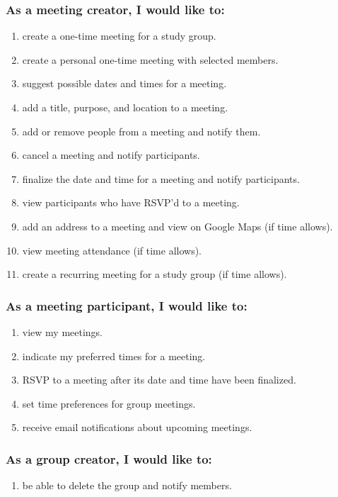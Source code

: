 \documentclass[12pt]{article}
\begin{document}
\subsubsection*{As a meeting creator, I would like to:}

\begin{enumerate}[nolistsep]
    \item create a one-time meeting for a study group.
    \item create a personal one-time meeting with selected members.
    \item suggest possible dates and times for a meeting.
    \item add a title, purpose, and location to a meeting.
    \item add or remove people from a meeting and notify them.
    \item cancel a meeting and notify participants.
    \item finalize the date and time for a meeting and notify participants.
    \item view participants who have RSVP'd to a meeting.
    \item add an address to a meeting and view on Google Maps (if time allows).
    \item view meeting attendance (if time allows).
    \item create a recurring meeting for a study group (if time allows).
\end{enumerate}

\newpage

\subsubsection*{As a meeting participant, I would like to:}

\begin{enumerate}[nolistsep]
    \item view my meetings.
    \item indicate my preferred times for a meeting.
    \item RSVP to a meeting after its date and time have been finalized.
    \item set time preferences for group meetings.
    \item receive email notifications about upcoming meetings.
\end{enumerate}

\subsubsection*{As a group creator, I would like to:}
\begin{enumerate}[nolistsep]
    \item be able to delete the group and notify members.
\end{enumerate}
\end{document}
